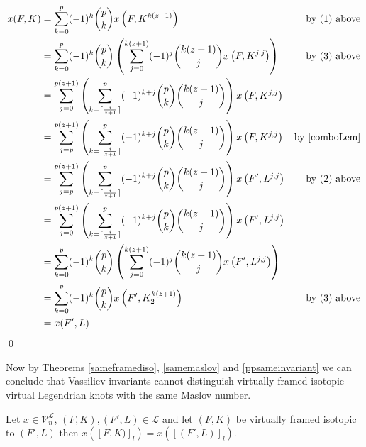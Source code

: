 \begin{align*}
x(F, K) &= \sum_{k=0}^p(-1)^k\binom{p}{k} x\left(F, K^{k(z+1)}\right)& \text{by (1) above}\\
&= \sum_{k=0}^p(-1)^k\binom{p}{k}\left(\sum_{j=0}^{k(z+1)}(-1)^j\binom{k(z+1)}{j}x\left(F, K^{j,j}\right)\right)& \text{by (3) above}\\
&= \sum_{j=0}^{p(z+1)} \left( \sum_{k=\lceil\frac{i}{z+1}\rceil}^p (-1)^{k+j}\binom{p}{k}\binom{k(z+1)}{j} \right) x\left(F, K^{j,j}\right)&\\
&= \sum_{j=p}^{p(z+1)} \left( \sum_{k=\lceil\frac{i}{z+1}\rceil}^p (-1)^{k+j}\binom{p}{k}\binom{k(z+1)}{j} \right) x\left(F, K^{j,j}\right)& \text{by } \ref{comboLem}\\
&= \sum_{j=p}^{p(z+1)} \left( \sum_{k=\lceil\frac{i}{z+1}\rceil}^p (-1)^{k+j}\binom{p}{k}\binom{k(z+1)}{j} \right) x\left(F', L^{j,j}\right)& \text{by  (2) above} \\
&= \sum_{j=0}^{p(z+1)} \left( \sum_{k=\lceil\frac{i}{z+1}\rceil}^p (-1)^{k+j}\binom{p}{k}\binom{k(z+1)}{j} \right) x\left(F', L^{j,j}\right)&\\
&= \sum_{k=0}^p(-1)^k\binom{p}{k}\left(\sum_{j=0}^{k(z+1)}(-1)^j\binom{k(z+1)}{j}x\left(F', L^{j,j}\right)\right)&\\
&= \sum_{k=0}^p(-1)^k\binom{p}{k}x\left(F', K_2^{k(z+1)}\right)&\text{by (3) above}\\
&= x(F', L)
\end{align*} 
\qed

Now by Theorems \ref{sameframediso}, \ref{samemaslov} and \ref{ppsameinvariant} we can conclude that Vassiliev invariants cannot distinguish virtually framed isotopic virtual Legendrian knots with the same Maslov number.
\begin{thm}
Let $x\in \mathcal{V}_n^\mathcal{L}$, $(F, K), (F', L) \in \mathcal{L}$ and let $(F, K)$ be virtually framed isotopic to $(F', L)$ then $x([F, K)]_l) = x([(F', L)]_l)$.
\end{thm}